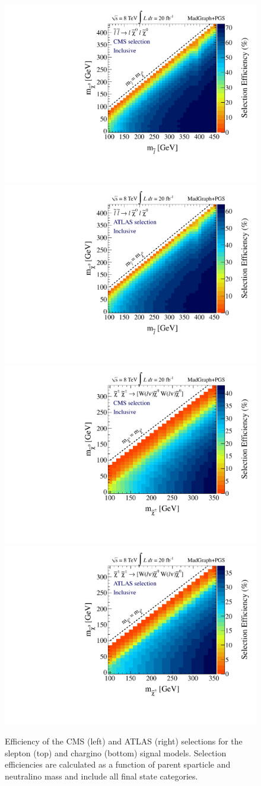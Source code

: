 \begin{figure}[ht]
\includegraphics[width=0.35\columnwidth]{fig/sectionIII/EFF_slepton_CMS_incl.pdf}
\includegraphics[width=0.35\columnwidth]{fig/sectionIII/EFF_slepton_ATLAS_incl.pdf}\\
\includegraphics[width=0.35\columnwidth]{fig/sectionIII/EFF_chargino_CMS_incl.pdf}
\includegraphics[width=0.35\columnwidth]{fig/sectionIII/EFF_chargino_ATLAS_incl.pdf}
\caption{Efficiency of the CMS (left) and ATLAS (right) selections for the slepton (top) and chargino (bottom) signal models. Selection efficiencies are calculated as a function of parent sparticle and neutralino mass and include all final state categories. \label{fig:EFF_inclusive}}
\end{figure}

